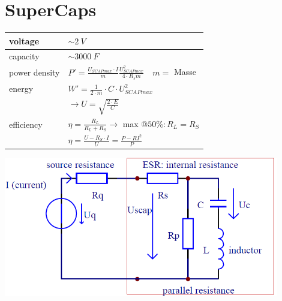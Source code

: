 \section{SuperCaps}
\begin{minipage}[lt]{10cm}
	{\footnotesize \begin{tabular}[c]{ | p{3cm} | p{6cm} |}
	    	\hline
	    	voltage		  & $\sim 2~V$ \\
	    	\hline
	    	capacity	  & $\sim 3000~F$ \\
	    	\hline
	    	power density & $P' = \frac{U_{SCAPmax} \cdot I}{m} \frac{U_{SCAPmax}^2}{4 \cdot R_s \dot m} \quad m =$ Masse\\
	    	\hline
	    	energy		  & $W' = \frac{1}{2 \cdot m} \cdot C \cdot U_{SCAPmax}^2$ \\
	    	 & $\rightarrow U = \sqrt{\frac{2 \cdot E}{C}}$\\
	    	\hline
	    	efficiency	  & $\eta = \frac{R_L}{R_L + R_S} \rightarrow$ max @$50\%: R_L = R_S$ \\
	    	 & $\eta = \frac{U - R_S \cdot I}{U} = \frac{P - R I^2}{P}$ \\
	    	\hline
	\end{tabular}}
\end{minipage}
\begin{minipage}[rt]{7cm}
	\centering
	\includegraphics[width=0.9\textwidth]{./images/SCAP_real.png}
\end{minipage}
